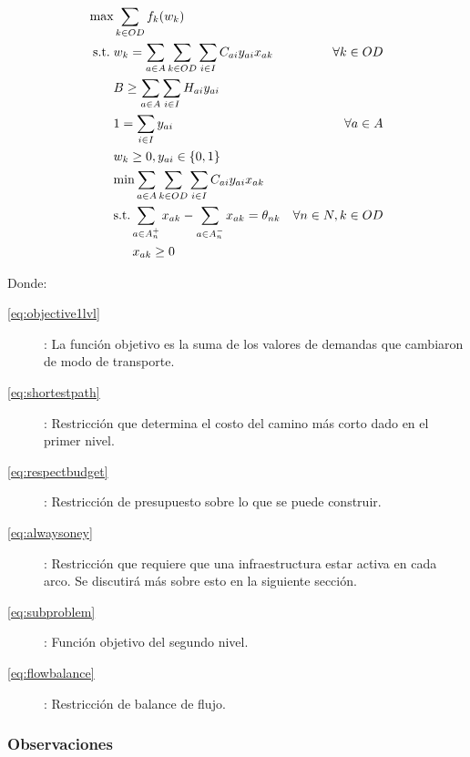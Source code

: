 \documentclass{article}
\newcommand{\modelspace}{\hspace{1.5em}}
\begin{document}
  \begin{align}
    \text{max}    & \sum_{k \in OD} f_k(w_k)                                                         & \label{eq:objective1lvl} \\
    \text{s.t.}\; & w_k = \sum_{a \in A} \sum_{k \in OD} \sum_{i \in I} C_{ai}y_{ai}x_{ak}           & \forall k \in OD \label{eq:shortestpath} \\
                  & B \geq \sum_{a \in A} \sum_{i \in I} H_{ai}y_{ai}                                & \label{eq:respectbudget} \\
                  & 1 = \sum_{i \in I} y_{ai}                                                        & \forall a \in A \label{eq:alwaysoney} \\
                  & w_k \geq 0, y_{ai} \in \{0,1\}                                                   & \nonumber \\
                  & \text{min} \sum_{a \in A} \sum_{k \in OD} \sum_{i \in I} C_{ai}y_{ai}x_{ak}      & \label{eq:subproblem} \\
                  & \text{s.t.} \sum_{a \in A_n^+} x_{ak} - \sum_{a \in A_n^-} x_{ak} = \theta_{nk}  & \forall n \in N, k \in OD \label {eq:flowbalance} \\
                  & \modelspace x_{ak} \geq 0                                                        & \nonumber
  \end{align}

  Donde:

  \begin{description}
    \item[\ref{eq:objective1lvl}]: La función objetivo es la suma de los valores de demandas que cambiaron de modo de transporte.
    \item[\ref{eq:shortestpath}]: Restricción que determina el costo del camino más corto dado en el primer nivel.
    \item[\ref{eq:respectbudget}]: Restricción de presupuesto sobre lo que se puede construir.
    \item[\ref{eq:alwaysoney}]: Restricción que requiere que una infraestructura estar activa en cada arco. Se discutirá más sobre esto en la siguiente sección.
    \item[\ref{eq:subproblem}]: Función objetivo del segundo nivel.
    \item[\ref{eq:flowbalance}]: Restricción de balance de flujo.
  \end{description}

  \subsubsection*{Observaciones}
\end{document}
